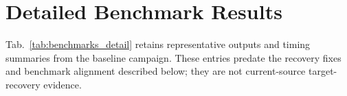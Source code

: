 \documentclass[runningheads]{llncs}
\begin{document}



\newpage
\appendix
\renewcommand{\thesection}{\Alph{section}}
\renewcommand{\theHsection}{\Alph{section}}
\renewcommand{\thesubsection}{\thesection.\arabic{subsection}}
\renewcommand{\theHsubsection}{\thesection.\arabic{subsection}}
\section{Detailed Benchmark Results}
\label{sec:appendix_benchmarks}

Tab.~\ref{tab:benchmarks_detail} retains representative outputs and timing summaries from the baseline campaign.  These entries predate the recovery fixes and benchmark alignment described below; they are not current-source target-recovery evidence.
\end{document}
